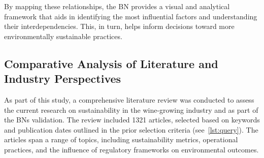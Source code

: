 \documentclass[10pt,letterpaper]{article}
\begin{document}
By mapping these relationships, the BN provides a visual and analytical framework that aids in identifying the most influential factors and understanding their interdependencies. This, in turn, helps inform decisions toward more environmentally sustainable practices.

\subsection*{Comparative Analysis of Literature and Industry Perspectives}

As part of this study, a comprehensive literature review was conducted to assess the current research on sustainability in the wine-growing industry and as part of the BNs validation. The review included 1321 articles, selected based on keywords and publication dates outlined in the prior selection criteria (see~\ref{lst:query}). The articles span a range of topics, including sustainability metrics, operational practices, and the influence of regulatory frameworks on environmental outcomes.
\end{document}
